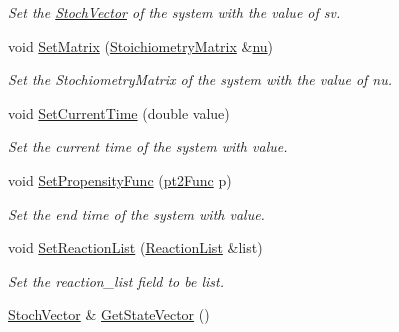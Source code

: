 \begin{CompactItemize}
\begin{CompactList}\small\item\em Set the \hyperlink{class_stoch_vector}{StochVector} of the system with the value of sv. \item\end{CompactList}\item 
\hypertarget{class_base_system_b9206753cdaf355d53f1294498ae5246}{
void \hyperlink{class_base_system_b9206753cdaf355d53f1294498ae5246}{SetMatrix} (\hyperlink{class_stoichiometry_matrix}{StoichiometryMatrix} \&\hyperlink{class_base_system_d664dd55778f4e00a06cb3583b4c27e8}{nu})}
\label{class_base_system_b9206753cdaf355d53f1294498ae5246}

\begin{CompactList}\small\item\em Set the StochiometryMatrix of the system with the value of nu. \item\end{CompactList}\item 
\hypertarget{class_base_system_54785e31ad495b9e8dacbdc65da150a8}{
void \hyperlink{class_base_system_54785e31ad495b9e8dacbdc65da150a8}{SetCurrentTime} (double value)}
\label{class_base_system_54785e31ad495b9e8dacbdc65da150a8}

\begin{CompactList}\small\item\em Set the current time of the system with value. \item\end{CompactList}\item 
void \hyperlink{class_base_system_8e3cbc98ab5096bd1cb79ece746c2d06}{SetPropensityFunc} (\hyperlink{class_base_system_9ce58c7ac60c7208b32233435ee5fd72}{pt2Func} p)
\begin{CompactList}\small\item\em Set the end time of the system with value. \item\end{CompactList}\item 
\hypertarget{class_base_system_bc2d5e999f8953d3630608058c353ae2}{
void \hyperlink{class_base_system_bc2d5e999f8953d3630608058c353ae2}{SetReactionList} (\hyperlink{class_reaction_list}{ReactionList} \&list)}
\label{class_base_system_bc2d5e999f8953d3630608058c353ae2}

\begin{CompactList}\small\item\em Set the reaction\_\-list field to be list. \item\end{CompactList}\item 
\hypertarget{class_base_system_2f7ce9c76a75c32fec2adc40e26d7787}{
\hyperlink{class_stoch_vector}{StochVector} \& \hyperlink{class_base_system_2f7ce9c76a75c32fec2adc40e26d7787}{GetStateVector} ()}
\label{class_base_system_2f7ce9c76a75c32fec2adc40e26d7787}


\end{CompactItemize}
